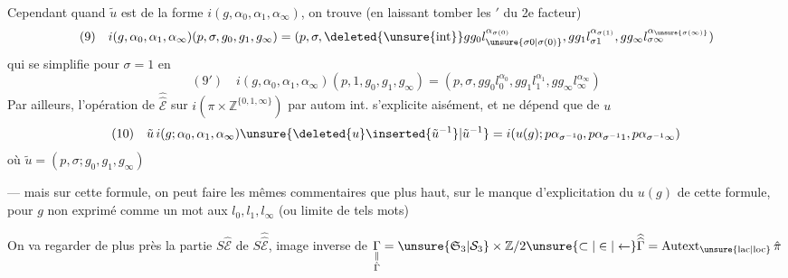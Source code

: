 Cependant quand $\tilde u$ est de la forme $i(g,\alpha_0,\alpha_1,\alpha_\infty)$, on trouve (en laissant tomber les $'$ du 2e facteur)
\[
(9)\quad i(g,\alpha_0,\alpha_1,\alpha_\infty)(p,\sigma,g_0,g_1,g_\infty)=(p,\sigma,\deleted{\unsure{\operatorname{int}}}gg_0l_{\unsure{\sigma0|\sigma(0)}}^{\alpha_{\sigma(0)}},gg_1l_{\sigma1}^{\alpha_{\sigma(1)}},gg_\infty l_{\sigma\infty}^{\alpha_{\unsure{\sigma(\infty)}}})
\]
qui se simplifie pour $\sigma=1$ en
\[
(9')\quad i(g,\alpha_0,\alpha_1,\alpha_\infty)(p,1,g_0,g_1,g_\infty)=(p,\sigma,gg_0l_0^{\alpha_0},gg_1l_1^{\alpha_1},gg_\infty l_\infty^{\alpha_\infty})
\]
Par ailleurs, l'opération de $\widehat{\widehat{\mathcal E}}$ sur $i(\pi\times\mathbb Z^{\{0,1,\infty\}})$ par autom int. s'explicite aisément, et ne dépend que de $u$ 
\[
(10)\quad\tilde u\,i(g;\alpha_0,\alpha_1,\alpha_\infty)\unsure{\deleted{u}\inserted{\tilde u^{-1}}|\tilde u^{-1}}=i(u(g);p\alpha_{\sigma^{-1}0},p\alpha_{\sigma^{-1}1},p\alpha_{\sigma^{-1}\infty})
\]
où $\tilde u=(p,\sigma;g_0,g_1,g_\infty)$

--- mais sur cette formule, on peut faire les mêmes commentaires que plus haut, sur le manque d'explicitation du  $u(g)$ de cette formule, pour $g$ non exprimé comme un mot  aux $l_0,l_1,l_\infty$ (ou limite de tels mots)

On va regarder de plus près la partie $S\hat{\mathcal E}$ de $S\widehat{\widehat{\mathcal E}}$, image inverse de
$\underset{\substack{\Vert\\\hat\Gamma}}{\Gamma}=\unsure{\mathfrak S_3|\mathcal S_3}\times\mathbb Z/2\unsure{\subset|\in|\leftarrow}\widehat{\widehat\Gamma}=\operatorname{Autext}_{\unsure{\mathrm{lac}|\mathrm{loc}}}\hat\pi$

